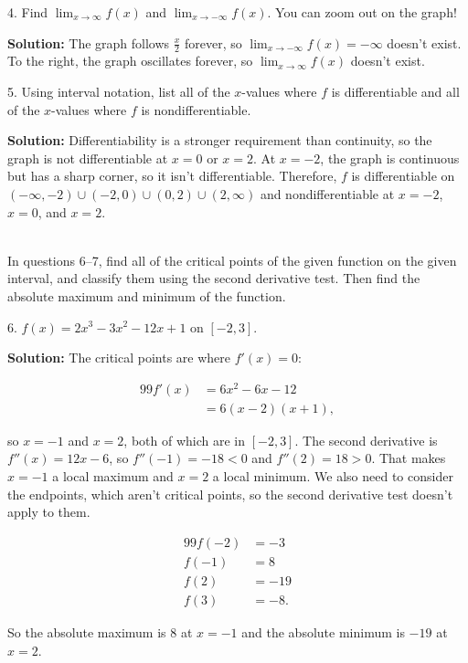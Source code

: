 \documentclass{article}
\begin{document}
4. Find $\displaystyle \lim_{x \to \infty} f(x)$ and $\displaystyle \lim_{x \to -\infty} f(x)$. You can zoom out on the graph!

\textbf{Solution:} The graph follows $\frac{x}{2}$ forever, so $\displaystyle \lim_{x \to -\infty} f(x) = -\infty$ doesn't exist. To the right, the graph oscillates forever, so $\displaystyle \lim_{x \to \infty} f(x)$ doesn't exist.

5. Using interval notation, list all of the $x$-values where $f$ is differentiable and all of the $x$-values where $f$ is nondifferentiable.

\textbf{Solution:} Differentiability is a stronger requirement than continuity, so the graph is not differentiable at $x = 0$ or $x = 2$. At $x = -2$, the graph is continuous but has a sharp corner, so it isn't differentiable. Therefore, $f$ is differentiable on $(-\infty, -2) \cup (-2, 0) \cup (0, 2) \cup (2, \infty)$ and nondifferentiable at $x = -2$, $x = 0$, and $x = 2$.

~\\

In questions 6--7, find all of the critical points of the given function on the given interval, and classify them using the second derivative test. Then find the absolute maximum and minimum of the function.

6. $f(x) = 2x^3 - 3x^2 - 12x + 1$ on $[-2, 3]$.

\textbf{Solution:} The critical points are where $f'(x) = 0$:

\begin{alignat*}{99}
	f'(x) &= 6x^2 - 6x - 12\\
	&= 6(x - 2)(x + 1),
\end{alignat*}

so $x = -1$ and $x = 2$, both of which are in $[-2, 3]$. The second derivative is $f''(x) = 12x - 6$, so $f''(-1) = -18 < 0$ and $f''(2) = 18 > 0$. That makes $x = -1$ a local maximum and $x = 2$ a local minimum. We also need to consider the endpoints, which aren't critical points, so the second derivative test doesn't apply to them.

\begin{alignat*}{99}
	f(-2) &= -3\\
	f(-1) &= 8\\
	f(2) &= -19\\
	f(3) &= -8.
\end{alignat*}

So the absolute maximum is $8$ at $x = -1$ and the absolute minimum is $-19$ at $x = 2$.
\end{document}
